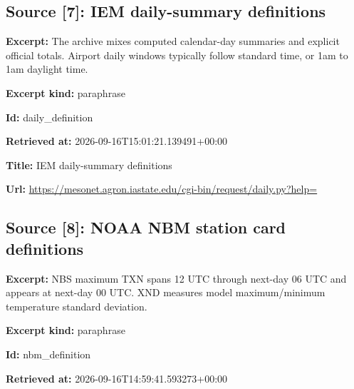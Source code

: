 \documentclass[11pt]{article}
\begin{document}
\subsection*{\textcolor{epdarkgreen}{Source [7]: IEM daily-summary definitions}}
\par\noindent\textbf{Excerpt:} The archive mixes computed calendar-day summaries and explicit official totals. Airport daily windows typically follow standard time, or 1am to 1am daylight time.

\par\noindent\textbf{Excerpt kind:} paraphrase

\par\noindent\textbf{Id:} daily\_definition

\par\noindent\textbf{Retrieved at:} 2026-09-16T1\hspace{0pt}5:01:21.1394\hspace{0pt}91+00:00

\par\noindent\textbf{Title:} IEM daily-summary definitions

\par\noindent\textbf{Url:} \href{https://mesonet.agron.iastate.edu/cgi-bin/request/daily.py?help=}{https://meso\hspace{0pt}net.agron.ia\hspace{0pt}state.edu/cg\hspace{0pt}i-bin/reques\hspace{0pt}t/daily.py?h\hspace{0pt}elp=}

\subsection*{\textcolor{epdarkgreen}{Source [8]: NOAA NBM station card definitions}}
\par\noindent\textbf{Excerpt:} NBS maximum TXN spans 12 UTC through next-day 06 UTC and appears at next-day 00 UTC. XND measures model maximum/minimum temperature standard deviation.

\par\noindent\textbf{Excerpt kind:} paraphrase

\par\noindent\textbf{Id:} nbm\_definition

\par\noindent\textbf{Retrieved at:} 2026-09-16T1\hspace{0pt}4:59:41.5932\hspace{0pt}73+00:00
\end{document}
